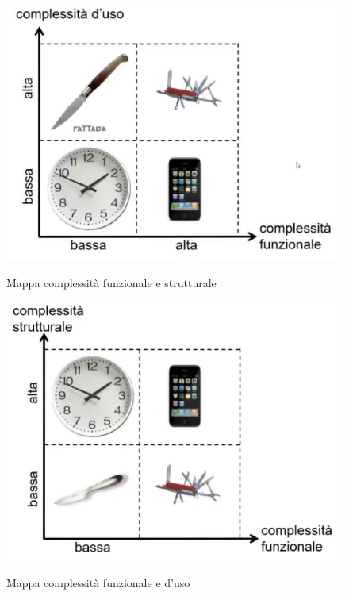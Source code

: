\documentclass[11pt,a4paper]{book}
\begin{document}
\begin{figure}[h!]
	\begin{center}
		\includegraphics[scale=0.6]{img/008.jpg}
		\caption{Mappa complessità funzionale e strutturale}
		\label{fig: 008}
		\includegraphics[scale=0.6]{img/009.jpg}
		\caption{Mappa complessità funzionale e d'uso}
		\label{fig: 009}
	\end{center}
\end{figure}
\end{document}
